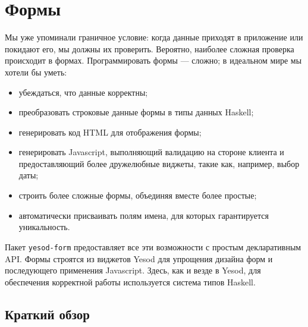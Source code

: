 \chapter{Формы}

Мы уже упоминали граничное условие: когда данные приходят в приложение или покидают его,
мы должны их проверить. Вероятно, наиболее сложная проверка происходит в формах.
Программировать формы --- сложно; в идеальном мире мы хотели бы уметь:

\begin{itemize}
\item убеждаться, что данные корректны;
\item преобразовать строковые данные формы в типы данных Haskell; %
\item генерировать код HTML для отображения формы;
\item генерировать Javascript, выполняющий валидацию на стороне клиента и предоставляющий
более дружелюбные виджеты, такие как, например, выбор даты;
\item строить более сложные формы, объединяя вместе более простые;
\item автоматически присваивать полям имена, для которых гарантируется уникальность.
\end{itemize}

Пакет \lstinline'yesod-form' предоставляет все эти возможности с простым декларативным
API. Формы строятся из виджетов Yesod для упрощения дизайна форм и последующего применения
Javascript. Здесь, как и везде в Yesod, для обеспечения
корректной работы используется система типов Haskell.

\section{Краткий обзор}


